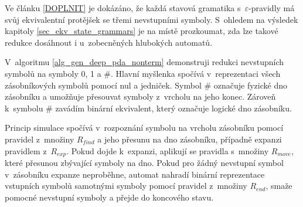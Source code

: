 Ve článku \ref{DOPLNIT} je dokázáno, že každá stavová gramatika s~$\varepsilon$-pravidly má svůj ekvivalentní protějšek se třemi nevstupními symboly. S~ohledem na výsledek kapitoly \ref{sec_ekv_state_grammars} je na místě prozkoumat, zda lze takové redukce dosáhnout i u~zobecněných hlubokých automatů.

V~algoritmu \ref{alg_gen_deep_pda_nonterm} demonstruji redukci nevstupních symbolů na symboly 0, 1 a \#. Hlavní myšlenka spočívá v~reprezentaci všech zásobníkových symbolů pomocí nul a jedniček. Symbol \# označuje fyzické dno zásobníku a umožňuje přesouvat symboly z~vrcholu na jeho konec. Zároveň k~symbolu \# zavádím binární ekvivalent, který označuje logické dno zásobníku. 

Princip simulace spočívá v~rozpoznání symbolu na vrcholu zásobníku pomocí pravidel z~množiny $R_{find}$ a jeho přesunu na dno zásobníku, případně expanzi pravidlem z~$R_{exp}$. Pokud dojde k~expanzi, aplikují se pravidla s~množiny $R_{move}$, které přesunou zbývající symboly na dno. Pokud pro žádný nevstupní symbol v~zásobníku expanze neproběhne, automat nahradí binární reprezentace vstupních symbolů samotnými symboly pomocí pravidel z~množiny $R_{end}$, smaže pomocné nevstupní symboly a přejde do koncového stavu.

